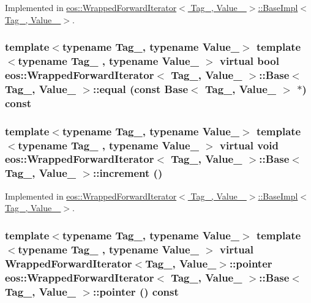 Implemented in \hyperlink{structeos_1_1WrappedForwardIterator_1_1BaseImpl_afe3d32be8e6bd2788db24f89e90ceef9}{eos::WrappedForwardIterator$<$ Tag\_\-, Value\_\- $>$::BaseImpl$<$ Tag\_\-, Value\_\- $>$}.\hypertarget{structeos_1_1WrappedForwardIterator_1_1Base_a4ec070b72367be2f7f52babe05c1f9bc}{
\subsubsection[{equal}]{\setlength{\rightskip}{0pt plus 5cm}template$<$typename Tag\_\-, typename Value\_\-$>$ template$<$typename Tag\_\- , typename Value\_\- $>$ virtual bool {\bf eos::WrappedForwardIterator}$<$ Tag\_\-, Value\_\- $>$::{\bf Base}$<$ Tag\_\-, Value\_\- $>$::equal (const {\bf Base}$<$ Tag\_\-, Value\_\- $>$ $\ast$) const}}
\label{structeos_1_1WrappedForwardIterator_1_1Base_a4ec070b72367be2f7f52babe05c1f9bc}
\hypertarget{structeos_1_1WrappedForwardIterator_1_1Base_a7ab151df86128ddc4e98c64211829544}{
\subsubsection[{increment}]{\setlength{\rightskip}{0pt plus 5cm}template$<$typename Tag\_\-, typename Value\_\-$>$ template$<$typename Tag\_\- , typename Value\_\- $>$ virtual void {\bf eos::WrappedForwardIterator}$<$ Tag\_\-, Value\_\- $>$::{\bf Base}$<$ Tag\_\-, Value\_\- $>$::increment ()}}
\label{structeos_1_1WrappedForwardIterator_1_1Base_a7ab151df86128ddc4e98c64211829544}


Implemented in \hyperlink{structeos_1_1WrappedForwardIterator_1_1BaseImpl_ac6565ae3236b5b128d671a1011f9c9ee}{eos::WrappedForwardIterator$<$ Tag\_\-, Value\_\- $>$::BaseImpl$<$ Tag\_\-, Value\_\- $>$}.\hypertarget{structeos_1_1WrappedForwardIterator_1_1Base_a3e63d544a83f5324f323f0d04c2203a3}{
\subsubsection[{pointer}]{\setlength{\rightskip}{0pt plus 5cm}template$<$typename Tag\_\-, typename Value\_\-$>$ template$<$typename Tag\_\- , typename Value\_\- $>$ virtual {\bf WrappedForwardIterator}$<$Tag\_\-, Value\_\-$>$::pointer {\bf eos::WrappedForwardIterator}$<$ Tag\_\-, Value\_\- $>$::{\bf Base}$<$ Tag\_\-, Value\_\- $>$::pointer () const}}
\label{structeos_1_1WrappedForwardIterator_1_1Base_a3e63d544a83f5324f323f0d04c2203a3}


